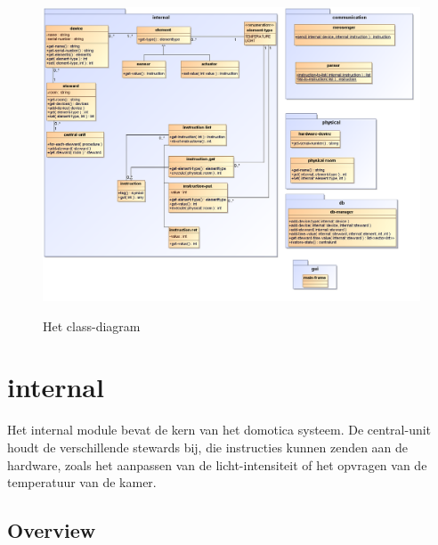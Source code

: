 \documentclass{article}
\begin{document}
\begin{figure}
	\begin{center}
		\href{run:./class-diagram.png}{\includegraphics[width=\columnwidth]{class-diagram.png}}
	\end{center}
	\caption{Het class-diagram}
\end{figure}

\newpage
\hypertarget{internal}{\section{internal}}
\label{internal}
Het internal module bevat de kern van het domotica systeem. De central-unit houdt de verschillende stewards bij, die instructies kunnen zenden aan de hardware, zoals het aanpassen van de licht-intensiteit of het opvragen van de temperatuur van de kamer.

\subsection{Overview}
\end{document}
